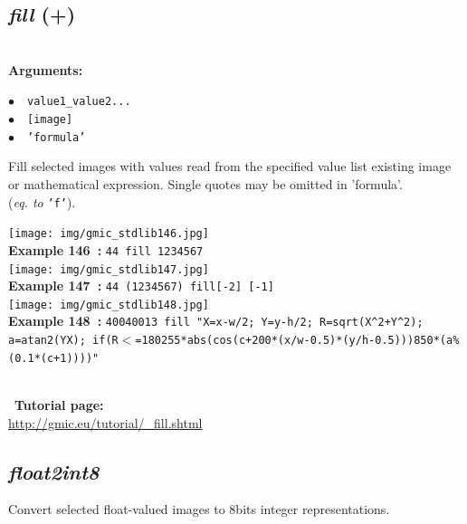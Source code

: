 \documentclass[a4paper,10.5pt,twoside]{book}
\def\comma{\discretionary{,}{}{,}}
\newcommand{\Cb}[1]{\textcolor{cb}{#1}}
\begin{document}
\subsection{\emph{fill} (+)}\vspace*{-0.7em}
~\\\textbf{\Cb{Arguments: }}\begin{flushleft}
{\small \Cb{\hspace*{0.5cm}$\bullet$~~\texttt{value1{\comma}\_value2{\comma}...}}}~~~\\
{\small \Cb{\hspace*{0.5cm}$\bullet$~~\texttt{[image]}}}~~~\\
{\small \Cb{\hspace*{0.5cm}$\bullet$~~\texttt{'formula'}}}\end{flushleft}
Fill selected images with values read from the specified value list{\comma} existing image
or mathematical expression. Single quotes may be omitted in 'formula'.
~\\(\emph{eq. to} {\small \texttt{'f'}}).
\begin{center}\texttt{[image: img/gmic\_stdlib146.jpg]}\\
{\footnotesize \textbf{Example 146~:} \texttt{4{\comma}4 fill 1{\comma}2{\comma}3{\comma}4{\comma}5{\comma}6{\comma}7}}
\\\texttt{[image: img/gmic\_stdlib147.jpg]}\\
{\footnotesize \textbf{Example 147~:} \texttt{4{\comma}4 (1{\comma}2{\comma}3{\comma}4{\comma}5{\comma}6{\comma}7) fill[-2] [-1]}}
\\\texttt{[image: img/gmic\_stdlib148.jpg]}\\
{\footnotesize \textbf{Example 148~:} \texttt{400{\comma}400{\comma}1{\comma}3 fill "X=x-w/2; Y=y-h/2; R=sqrt(X\textasciicircum 2+Y\textasciicircum 2); a=atan2(Y{\comma}X); if(R$<$=180{\comma}255*abs(cos(c+200*(x/w-0.5)*(y/h-0.5))){\comma}850*(a\%(0.1*(c+1))))"}}
\end{center}
~\\
~\textbf{Tutorial page: }\\\url{http://gmic.eu/tutorial/\_fill.shtml}


\subsection{\emph{float2int8} }\vspace*{-0.7em}
Convert selected float-valued images to 8bits integer representations.
\end{document}
